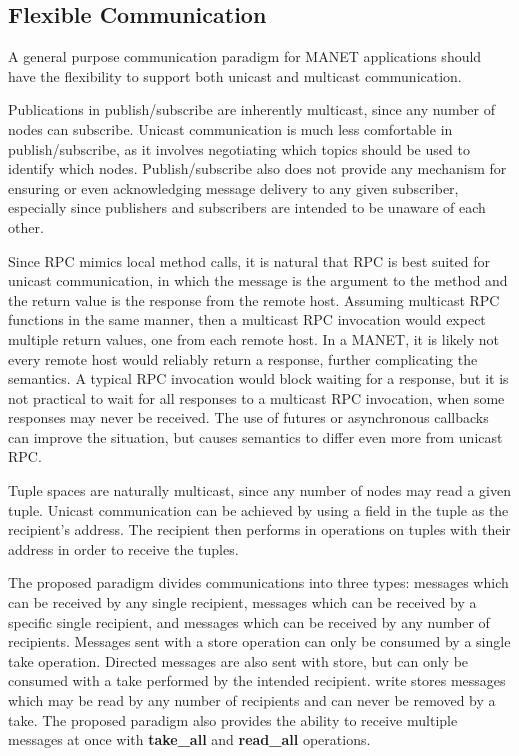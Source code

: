 \documentclass[lnicst]{svmultln}
\begin{document}
\subsection{Flexible Communication}

    A general purpose communication paradigm for MANET applications should have the flexibility to support both unicast and multicast communication.

    Publications in publish/subscribe are inherently multicast, since any number of nodes can subscribe. Unicast communication is much less comfortable in publish/subscribe, as it involves negotiating which topics should be used to identify which nodes. Publish/subscribe also does not provide any mechanism for ensuring or even acknowledging message delivery to any given subscriber, especially since publishers and subscribers are intended to be unaware of each other.

Since RPC mimics local method calls, it is natural that RPC is best suited for unicast communication, in which the message is the argument to the method and the return value is the response from the remote host. Assuming multicast RPC functions in the same manner, then a multicast RPC invocation would expect multiple return values, one from each remote host. In a MANET, it is likely not every remote host would reliably return a response, further complicating the semantics. A typical RPC invocation would block waiting for a response, but it is not practical to wait for all responses to a multicast RPC invocation, when some responses may never be received. The use of futures or asynchronous callbacks can improve the situation, but causes semantics to differ even more from unicast RPC.

    Tuple spaces are naturally multicast, since any number of nodes may read a given tuple. Unicast communication can be achieved by using a field in the tuple as the recipient’s address. The recipient then performs in operations on tuples with their address in order to receive the tuples.

    The proposed paradigm divides communications into three types: messages which can be received by any single recipient, messages which can be received by a specific single recipient, and messages which can be received by any number of recipients. Messages sent with a store operation can only be consumed by a single take operation. Directed messages are also sent with store, but can only be consumed with a take performed by the intended recipient. write stores messages which may be read by any number of recipients and can never be removed by a take. The proposed paradigm also provides the ability to receive multiple messages at once with \textbf{take\_all} and \textbf{read\_all} operations.    
    
\end{document}
